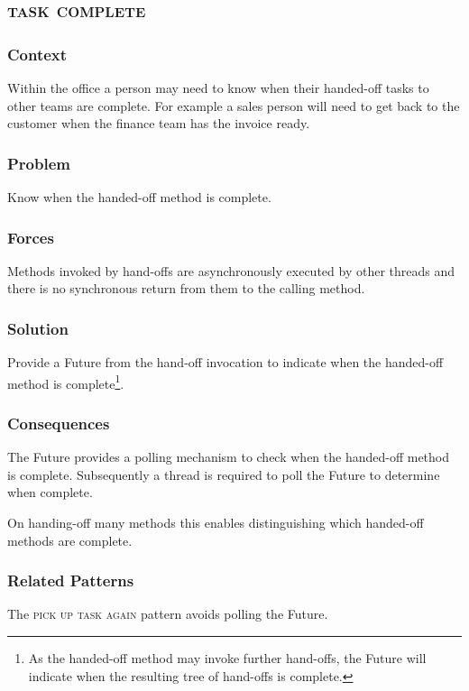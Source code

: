 \documentclass[prodmode]{style/acmlarge}
\begin{document}
\subsection{\textsc{\textbf{task complete}}}

\subsubsection*{Context} Within the office a person may need to know when their
handed-off tasks to other teams are complete.  For example a sales person will
need to get back to the customer when the finance team has the invoice ready.

\subsubsection*{Problem} Know when the handed-off method is complete.

\subsubsection*{Forces} Methods invoked by hand-offs are asynchronously executed by other
threads and there is no synchronous return from them to the calling method.

\subsubsection*{Solution} Provide a Future from the hand-off invocation to
indicate when the handed-off method is complete\footnote{As the handed-off
method may invoke further hand-offs, the Future will indicate when the resulting
tree of hand-offs is complete.}.

\subsubsection*{Consequences} The Future provides a polling mechanism to check
when the handed-off method is complete.  Subsequently a thread is required to
poll the Future to determine when complete.

On handing-off many methods this enables distinguishing which handed-off methods
are complete.

\subsubsection*{Related Patterns} The \textsc{pick up task again} pattern avoids
polling the Future.
\end{document}
